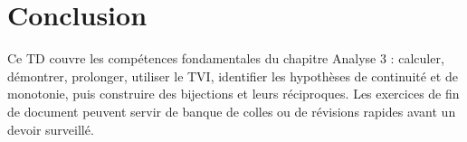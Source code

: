 \documentclass[11pt,a4paper]{article}
\begin{document}
\section*{Conclusion}
Ce TD couvre les compétences fondamentales du chapitre Analyse 3 : calculer, démontrer, prolonger, utiliser le TVI, identifier les hypothèses de continuité et de monotonie, puis construire des bijections et leurs réciproques. Les exercices de fin de document peuvent servir de banque de colles ou de révisions rapides avant un devoir surveillé.
\end{document}
